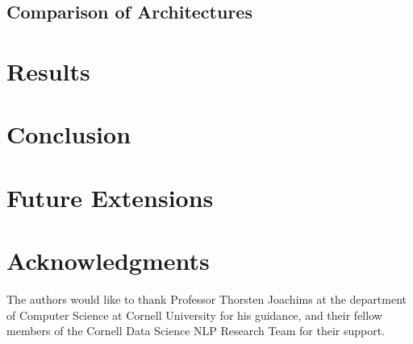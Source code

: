 \documentclass{vldb}
\begin{document}
\subsection{Comparison of Architectures}

\section{Results}

\section{Conclusion}

\section{Future Extensions}

\section{Acknowledgments}
The authors would like to thank Professor Thorsten Joachims at the department of Computer Science at Cornell University for his guidance, and their fellow members of the Cornell Data Science NLP Research Team for their support.


  



\begin{appendix}

\end{appendix}
\end{document}
